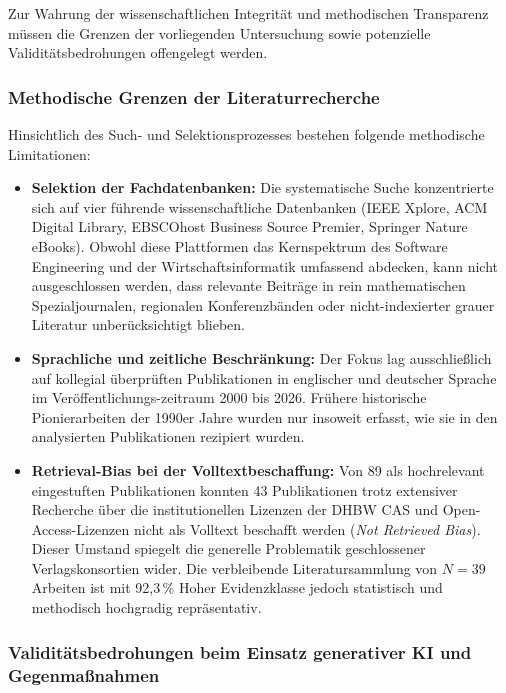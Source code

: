 Zur Wahrung der wissenschaftlichen Integrität und methodischen Transparenz müssen die Grenzen der vorliegenden Untersuchung sowie potenzielle Validitätsbedrohungen offengelegt werden.

\subsubsection{Methodische Grenzen der Literaturrecherche}
\label{subsubsec:grenzen_recherche}

Hinsichtlich des Such- und Selektionsprozesses bestehen folgende methodische Limitationen:
\begin{itemize}[leftmargin=*]
  \item \textbf{Selektion der Fachdatenbanken:} Die systematische Suche konzentrierte sich auf vier führende wissenschaftliche Datenbanken (IEEE Xplore, ACM Digital Library, EBSCOhost Business Source Premier, Springer Nature eBooks). Obwohl diese Plattformen das Kernspektrum des Software Engineering und der Wirtschaftsinformatik umfassend abdecken, kann nicht ausgeschlossen werden, dass relevante Beiträge in rein mathematischen Spezialjournalen, regionalen Konferenzbänden oder nicht-indexierter grauer Literatur unberücksichtigt blieben.
  \item \textbf{Sprachliche und zeitliche Beschränkung:} Der Fokus lag ausschließlich auf kollegial überprüften Publikationen in englischer und deutscher Sprache im Veröffentlichungs-zeitraum 2000 bis 2026. Frühere historische Pionierarbeiten der 1990er Jahre wurden nur insoweit erfasst, wie sie in den analysierten Publikationen rezipiert wurden.
  \item \textbf{Retrieval-Bias bei der Volltextbeschaffung:} Von 89 als hochrelevant eingestuften Publikationen konnten 43 Publikationen trotz extensiver Recherche über die institutionellen Lizenzen der DHBW CAS und Open-Access-Lizenzen nicht als Volltext beschafft werden (\textit{Not Retrieved Bias}). Dieser Umstand spiegelt die generelle Problematik geschlossener Verlagskonsortien wider. Die verbleibende Literatursammlung von $N = 39$ Arbeiten ist mit 92,3\,\% Hoher Evidenzklasse jedoch statistisch und methodisch hochgradig repräsentativ.
\end{itemize}

\subsubsection{Validitätsbedrohungen beim Einsatz generativer KI und Gegenmaßnahmen}
\label{subsubsec:validitaet_ki}

